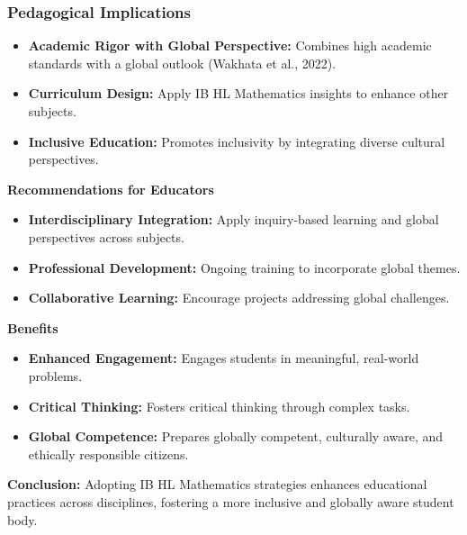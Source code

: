 \documentclass{beamer}
\begin{document}
\begin{frame}
  \frametitle{Pedagogical Implications}
  \begin{itemize}
      \item \textbf{Academic Rigor with Global Perspective:} Combines high academic standards with a global outlook (Wakhata et al., 2022).
      \item \textbf{Curriculum Design:} Apply IB HL Mathematics insights to enhance other subjects.
      \item \textbf{Inclusive Education:} Promotes inclusivity by integrating diverse cultural perspectives.
  \end{itemize}
  \vspace{0.3cm}
\end{frame}
\begin{frame}
  

  \textbf{Recommendations for Educators}
  \begin{itemize}
      \item \textbf{Interdisciplinary Integration:} Apply inquiry-based learning and global perspectives across subjects.
      \item \textbf{Professional Development:} Ongoing training to incorporate global themes.
      \item \textbf{Collaborative Learning:} Encourage projects addressing global challenges.
  \end{itemize}
  \vspace{0.3cm}
\end{frame}
\begin{frame}
  
  \textbf{Benefits}
  \begin{itemize}
      \item \textbf{Enhanced Engagement:} Engages students in meaningful, real-world problems.
      \item \textbf{Critical Thinking:} Fosters critical thinking through complex tasks.
      \item \textbf{Global Competence:} Prepares globally competent, culturally aware, and ethically responsible citizens.
  \end{itemize}
  \vspace{0.3cm}
  \textbf{Conclusion:} Adopting IB HL Mathematics strategies enhances educational practices across disciplines, fostering a more inclusive and globally aware student body.
\end{frame}
\end{document}

